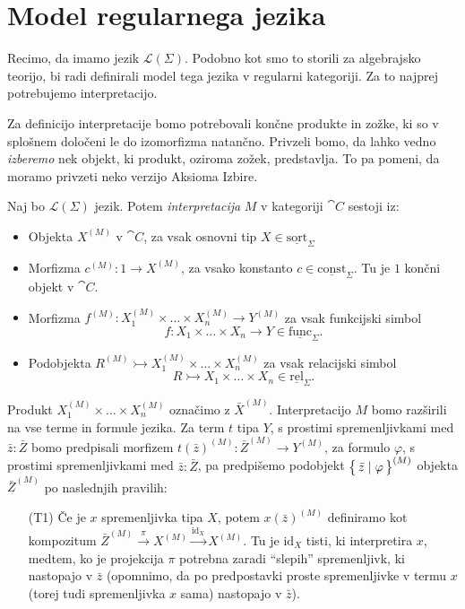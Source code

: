 \documentclass[../kategoricna_logika.tex]{subfiles}
\begin{document}
\section{Model regularnega jezika}
Recimo, da imamo jezik $\mathcal{L}(\Sigma)$. Podobno kot smo to storili za
algebrajsko teorijo, bi radi definirali model tega jezika v regularni
kategoriji.  Za to najprej potrebujemo interpretacijo.
\begin{opomba}
  Za definicijo interpretacije bomo potrebovali končne produkte in
  zožke, ki so v splošnem določeni le do izomorfizma natančno.
  Privzeli bomo, da lahko vedno \emph{izberemo} nek objekt, ki
  produkt, oziroma zožek, predstavlja. To pa pomeni, da moramo
  privzeti neko verzijo Aksioma Izbire.
\end{opomba}
\begin{definicija}
  Naj bo $\mathcal{L}(\Sigma)$ jezik. Potem \emph{interpretacija} $M$
  v kategoriji $\cat{C}$ sestoji iz:
  \begin{itemize}
  \item Objekta $X^{(M)}$ v $\cat{C}$, za vsak osnovni tip
    $X \in \underline{\mathrm{sort}}_\Sigma$
  \item Morfizma $c^{(M)} : 1 \to X^{(M)}$, za vsako konstanto
    $c \in \underline{\mathrm{const}}_\Sigma$. Tu je $1$ končni objekt
    v $\cat{C}$.
  \item Morfizma
    $f^{(M)} : X_1^{(M)} \times \ldots \times X_n^{(M)} \to Y^{(M)}$
    za vsak funkcijski simbol
    \[f : X_1 \times \ldots \times X_n \to Y \in
    \underline{\mathrm{func}}_\Sigma.\]
  \item Podobjekta
    $R^{(M)} \rightarrowtail X_1^{(M)} \times \ldots \times X_n^{(M)}$
    za vsak relacijski simbol
    \[R \rightarrowtail X_1 \times \ldots \times X_n \in
    \underline{\mathrm{rel}}_\Sigma.\]
  \end{itemize}
  Produkt $X_1^{(M)} \times \ldots \times X_n^{(M)}$ označimo z
  $\bar{X}^{(M)}$.  Interpretacijo $M$ bomo razširili na vse terme in
  formule jezika.  Za term $t$ tipa $Y$, s prostimi spremenljivkami
  med $\bar{z} : \bar{Z}$ bomo predpisali morfizem
  $t(\bar{z})^{(M)} : \bar{Z}^{(M)} \to Y^{(M)}$, za formulo
  $\varphi$, s prostimi spremenljivkami med $\bar{z} : \bar{Z}$, pa
  predpišemo podobjekt $\left\lbrace\,\bar{z} \mid \varphi\,\right\rbrace^{(M)}$ objekta
  $\bar{Z}^{(M)}$ po naslednjih pravilih:
  \begin{itemize}
  \item[(T1)] Če je $x$ spremenljivka tipa $X$, potem
    $x(\bar{z})^{(M)}$ definiramo kot kompo\-zi\-tum
    $\bar{Z}^{(M)} \xrightarrow{\pi} X^{(M)}
    \xrightarrow{\mathrm{id}_X} X^{(M)}$.  Tu je $\mathrm{id}_X$
    tisti, ki interpretira $x$, medtem, ko je projekcija $\pi$
    potrebna zaradi "`slepih"' spremenljivk, ki nastopajo v $\bar{z}$
    (opomnimo, da po predpostavki proste spremenljivke v termu $x$
    (torej tudi spremenljivka $x$ sama) nastopajo v $\bar{z}$).


\end{itemize}
\end{definicija}
\end{document}

